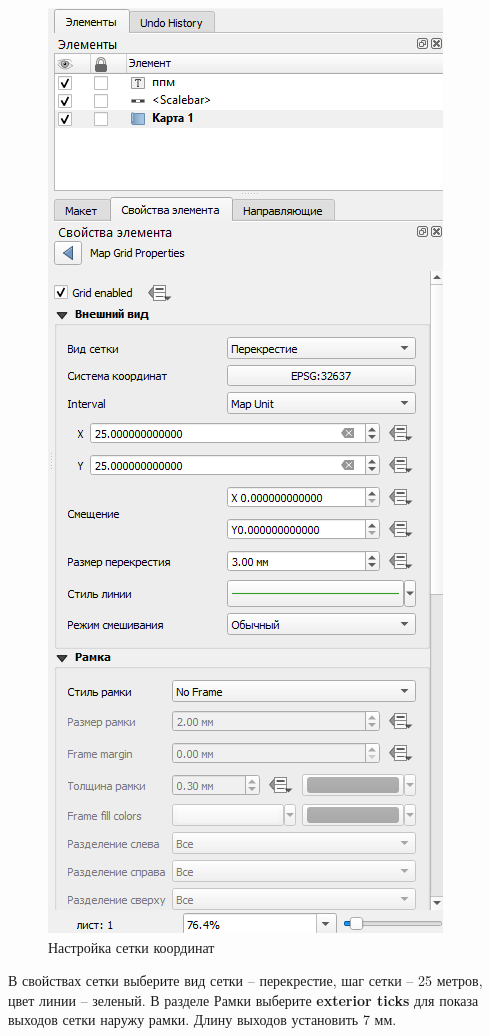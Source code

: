 \documentclass[
  12pt,
]{book}
\begin{document}
\begin{figure}
\centering
\includegraphics{images/symbology/Grid_settings.png}
\caption{Настройка сетки координат}
\end{figure}

В свойствах сетки выберите вид сетки -- перекрестие, шаг сетки -- 25 метров, цвет линии -- зеленый.
В разделе Рамки выберите \textbf{exterior ticks} для показа выходов сетки наружу рамки. Длину выходов установить 7 мм.
\end{document}
